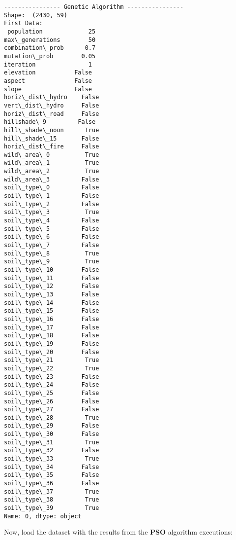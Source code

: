 \documentclass[11pt]{article}
\begin{document}
    \begin{Verbatim}[commandchars=\\\{\}]
---------------- Genetic Algorithm ----------------
Shape:  (2430, 59)
First Data:
 population             25
max\_generations        50
combination\_prob      0.7
mutation\_prob        0.05
iteration               1
elevation           False
aspect              False
slope               False
horiz\_dist\_hydro    False
vert\_dist\_hydro     False
horiz\_dist\_road     False
hillshade\_9         False
hill\_shade\_noon      True
hill\_shade\_15       False
horiz\_dist\_fire     False
wild\_area\_0          True
wild\_area\_1          True
wild\_area\_2          True
wild\_area\_3         False
soil\_type\_0         False
soil\_type\_1         False
soil\_type\_2         False
soil\_type\_3          True
soil\_type\_4         False
soil\_type\_5         False
soil\_type\_6         False
soil\_type\_7         False
soil\_type\_8          True
soil\_type\_9          True
soil\_type\_10        False
soil\_type\_11        False
soil\_type\_12        False
soil\_type\_13        False
soil\_type\_14        False
soil\_type\_15        False
soil\_type\_16        False
soil\_type\_17        False
soil\_type\_18        False
soil\_type\_19        False
soil\_type\_20        False
soil\_type\_21         True
soil\_type\_22         True
soil\_type\_23        False
soil\_type\_24        False
soil\_type\_25        False
soil\_type\_26        False
soil\_type\_27        False
soil\_type\_28         True
soil\_type\_29        False
soil\_type\_30        False
soil\_type\_31         True
soil\_type\_32        False
soil\_type\_33         True
soil\_type\_34        False
soil\_type\_35        False
soil\_type\_36        False
soil\_type\_37         True
soil\_type\_38         True
soil\_type\_39         True
Name: 0, dtype: object

    \end{Verbatim}

    Now, load the dataset with the results from the \textbf{PSO} algorithm
executions:
\end{document}
